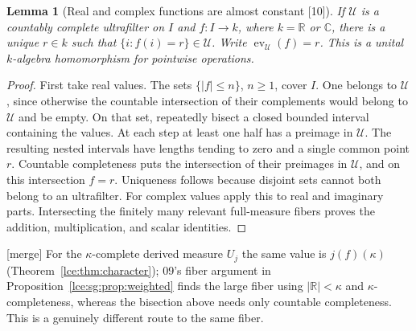\documentclass[11pt,letterpaper]{article}
\numberwithin{equation}{section}
\newtheorem{lemma}[theorem]{Lemma}
\theoremstyle{definition}
\theoremstyle{remark}
\newcommand{\R}{\mathbb R}
\newcommand{\C}{\mathbb C}
\newcommand{\abs}[1]{\lvert#1\rvert}
\newcommand{\thref}[1]{Theorem~\ref{#1}}
\newcommand{\prref}[1]{Proposition~\ref{#1}}
\newcommand{\src}[1]{\textup{\textsf{\small[#1]}}}%
\newcommand{\mergetag}{\textup{\textsf{\small[merge]}}}%
\newcommand{\ev}{\operatorname{ev}}
\begin{document}
\begin{lemma}[Real and complex functions are almost constant \src{10}]\label{lce:mf:lem:eval}
If $\mathcal U$ is a countably complete ultrafilter on $I$ and $f:I\to k$,
where $k=\R$ or $\C$, there is a unique $r\in k$ such that
$\{i:f(i)=r\}\in\mathcal U$. Write $\ev_{\mathcal U}(f)=r$. This is a unital
$k$-algebra homomorphism for pointwise operations.
\end{lemma}
\begin{proof}
First take real values. The sets $\{\abs f\le n\}$, $n\ge1$, cover $I$. One
belongs to $\mathcal U$, since otherwise the countable intersection of their
complements would belong to $\mathcal U$ and be empty. On that set,
repeatedly bisect a closed bounded interval containing the values. At each
step at least one half has a preimage in $\mathcal U$. The resulting nested
intervals have lengths tending to zero and a single common point $r$.
Countable completeness puts the intersection of their preimages in
$\mathcal U$, and on this intersection $f=r$. Uniqueness follows because
disjoint sets cannot both belong to an ultrafilter. For complex values apply
this to real and imaginary parts. Intersecting the finitely many relevant
full-measure fibers proves the addition, multiplication, and scalar
identities.
\end{proof}
\mergetag{} For the $\kappa$-complete derived measure $U_j$ the same value
is $j(f)(\kappa)$ (\thref{lce:thm:character}); 09's fiber argument in
\prref{lce:sg:prop:weighted} finds the large fiber using $\abs\R<\kappa$ and
$\kappa$-completeness, whereas the bisection above needs only countable
completeness. This is a genuinely different route to the same fiber.
\end{document}
